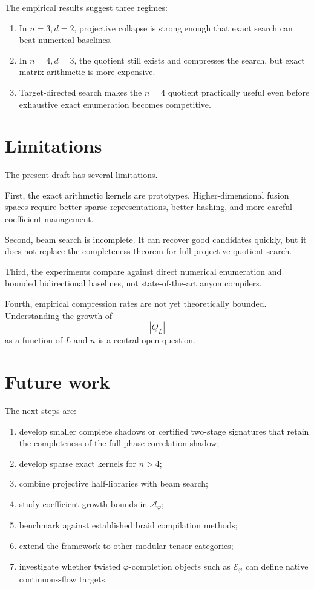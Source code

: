 \documentclass[11pt]{article}
\newcommand{\ph}{\varphi}
\newcommand{\A}{\mathcal A}
\newcommand{\Etw}{\mathcal E_{\ph}}
\begin{document}
The empirical results suggest three regimes:

\begin{enumerate}[label=(\roman*)]
    \item In $n=3,d=2$, projective collapse is strong enough that exact search can beat numerical baselines.
    \item In $n=4,d=3$, the quotient still exists and compresses the search, but exact matrix arithmetic is more expensive.
    \item Target-directed search makes the $n=4$ quotient practically useful even before exhaustive exact enumeration becomes competitive.
\end{enumerate}

\section{Limitations}

The present draft has several limitations.

First, the exact arithmetic kernels are prototypes.  Higher-dimensional fusion spaces require better sparse representations, better hashing, and more careful coefficient management.

Second, beam search is incomplete.  It can recover good candidates quickly, but it does not replace the completeness theorem for full projective quotient search.

Third, the experiments compare against direct numerical enumeration and bounded bidirectional baselines, not state-of-the-art anyon compilers.

Fourth, empirical compression rates are not yet theoretically bounded.  Understanding the growth of
\[
    |Q_L|
\]
as a function of $L$ and $n$ is a central open question.

\section{Future work}

The next steps are:

\begin{enumerate}[label=(\roman*)]
    \item develop smaller complete shadows or certified two-stage signatures that retain the completeness of the full phase-correlation shadow;
    \item develop sparse exact kernels for $n>4$;
    \item combine projective half-libraries with beam search;
    \item study coefficient-growth bounds in $\A_\ph$;
    \item benchmark against established braid compilation methods;
    \item extend the framework to other modular tensor categories;
    \item investigate whether twisted $\ph$-completion objects such as $\Etw$ can define native continuous-flow targets.
\end{enumerate}
\end{document}
